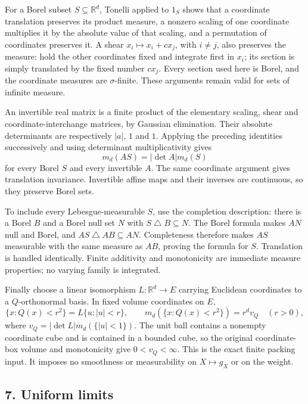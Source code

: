\documentclass[
  11pt,
]{article}
\begin{document}
For a Borel subset \(S\subseteq\mathbb R^d\), Tonelli applied to \(1_S\)
shows that a coordinate translation preserves its product measure, a
nonzero scaling of one coordinate multiplies it by the absolute value of
that scaling, and a permutation of coordinates preserves it. A shear
\(x_i\mapsto x_i+c x_j\), with \(i\ne j\), also preserves the measure:
hold the other coordinates fixed and integrate first in \(x_i\); its
section is simply translated by the fixed number \(c x_j\). Every
section used here is Borel, and the coordinate measures are
\(\sigma\)-finite. These arguments remain valid for sets of infinite
measure.

An invertible real matrix is a finite product of the elementary scaling,
shear and coordinate-interchange matrices, by Gaussian elimination.
Their absolute determinants are respectively \(|a|\), \(1\) and \(1\).
Applying the preceding identities successively and using determinant
multiplicativity gives \[
m_d(AS)=|\det A|m_d(S)
\] for every Borel \(S\) and every invertible \(A\). The same coordinate
argument gives translation invariance. Invertible affine maps and their
inverses are continuous, so they preserve Borel sets.

To include every Lebesgue-measurable \(S\), use the completion
description: there is a Borel \(B\) and a Borel null set \(N\) with
\(S\mathbin{\triangle}B\subseteq N\). The Borel formula makes \(AN\)
null and Borel, and \(AS\mathbin{\triangle}AB\subseteq AN\).
Completeness therefore makes \(AS\) measurable with the same measure as
\(AB\), proving the formula for \(S\). Translation is handled
identically. Finite additivity and monotonicity are immediate measure
properties; no varying family is integrated.

Finally choose a linear isomorphism \(L:\mathbb R^d\to E\) carrying
Euclidean coordinates to a \(Q\)-orthonormal basis. In fixed volume
coordinates on \(E\), \[
\{x:Q(x)<r^2\}=L\{u:|u|<r\},\qquad
m_d(\{x:Q(x)<r^2\})=r^d v_Q\quad(r>0),
\] where \(v_Q=|\det L|m_d(\{|u|<1\})\). The unit ball contains a
nonempty coordinate cube and is contained in a bounded cube, so the
original coordinate-box volume and monotonicity give \(0<v_Q<\infty\).
This is the exact finite packing input. It imposes no smoothness or
measurability on \(X\mapsto g_X\) or on the weight.

\subsection{7. Uniform limits}\label{uniform-limits}
\end{document}
